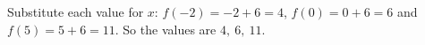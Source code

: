 Substitute each value for $x$: $f(-2)=-2+6=4$, $f(0)=0+6=6$ and $f(5)=5+6=11$. So the values are $\boxed{4,\ 6,\ 11}$.
